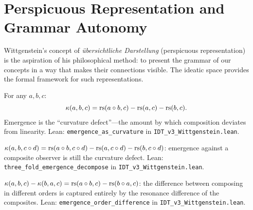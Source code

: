 \section{Perspicuous Representation and Grammar Autonomy}

Wittgenstein's concept of \emph{\"ubersichtliche Darstellung} (perspicuous
representation) is the aspiration of his philosophical method: to present
the grammar of our concepts in a way that makes their connections visible.
The ideatic space provides the formal framework for such representations.

\begin{theorem}
\label{thm:emergence-curvature}
For any $a, b, c$:
\[
\kappa(a, b, c) = \mathrm{rs}(a \circ b, c) - \mathrm{rs}(a, c) - \mathrm{rs}(b, c).
\]
Emergence is the ``curvature defect''---the amount by which composition deviates
from linearity.
Lean: \texttt{emergence\_as\_curvature} in \texttt{IDT\_v3\_Wittgenstein.lean}.
\end{theorem}

\begin{theorem}
\label{thm:three-fold-emergence}
$\kappa(a, b, c \circ d) = \mathrm{rs}(a \circ b, c \circ d) - \mathrm{rs}(a, c \circ d)
- \mathrm{rs}(b, c \circ d)$: emergence against a composite observer is still the
curvature defect.
Lean: \texttt{three\_fold\_emergence\_decompose} in
\texttt{IDT\_v3\_Wittgenstein.lean}.
\end{theorem}

\begin{theorem}
\label{thm:emergence-order}
$\kappa(a, b, c) - \kappa(b, a, c) = \mathrm{rs}(a \circ b, c) - \mathrm{rs}(b \circ a, c)$:
the difference between composing in different orders is captured entirely by the
resonance difference of the composites.
Lean: \texttt{emergence\_order\_difference} in
\texttt{IDT\_v3\_Wittgenstein.lean}.
\end{theorem}

